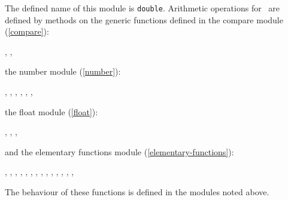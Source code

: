 %
\begin{optDefinition}
\noindent

The defined name of this module is {\tt double}.  Arithmetic operations for
\ are defined by methods on the generic functions defined
in the compare module (\ref{compare}):
%
\begin{flushleft}
    ,
    ,
\end{flushleft}
%
\noindent
the number module (\ref{number}):
%
\begin{flushleft}
    ,
    ,
    ,
    ,
    ,
    ,
\end{flushleft}
%
\noindent
the float module (\ref{float}):
\begin{flushleft}
,
,
,
\end{flushleft}
%
\noindent
and the elementary functions module (\ref{elementary-functions}):
\begin{flushleft}
,
,
,
,
,
,
,
,
,
,
,
,
,
,
\end{flushleft}
%
\noindent
The behaviour of these functions is defined in the modules noted
above.


\end{optDefinition}
